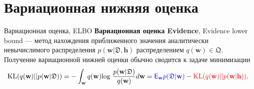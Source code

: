 \documentclass[usenames,dvipsnames,10pt,pdf,utf8,russian,aspectratio=43]{beamer}
\begin{document}
\section{Вариационная нижняя оценка}
\begin{frame}{Вариационная оценка, ELBO}
\textbf{Вариационная оценка Evidence}, Evidence lower bound --- метод нахождения приближенного значения аналитически невычислимого распределения $p(\mathbf{w}|\mathfrak{D}, \mathbf{h})$ распределением $q(\mathbf{w}) \in \mathfrak{Q}$. Получение вариационной нижней оценки обычно сводится к задаче минимизации
$$\text{KL}(q(\mathbf{w})||p(\mathbf{w}| \mathfrak{D}))=
-\int_{\mathbf{w}} q(\mathbf{w}) \text{log}~\frac{p(\mathbf{w}| \mathfrak{D})} {q(\mathbf{w})}d\mathbf{w} = \textcolor{blue}{\mathsf{E}_{\mathbf{w}} p(\mathfrak{D}|\mathbf{w})} - \textcolor{red}{\text{KL}(q(\mathbf{w})||p(\mathbf{w}| \mathbf{h}))}.
$$

\begin{figure}
  \centering
\label{fig:1}\qquad

\end{figure}

\end{frame}
\end{document}

